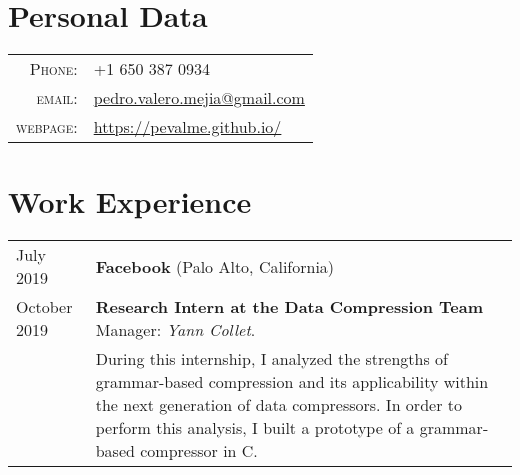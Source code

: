 \documentclass[a4paper,10pt]{article} %
\begin{document}
\pagestyle{empty} %




\par{\bigskip\par} %

\section{Personal Data}

\begin{tabular}{rl}
\textsc{Phone:} & +1 650 387 0934\\
\textsc{email:} & \href{mailto:pedro.valero.mejia@gmail.com}{pedro.valero.mejia@gmail.com} \\
\textsc{webpage:} & \href{https://pevalme.github.io/}{https://pevalme.github.io/}\\
\end{tabular}

\section{Work Experience}

\begin{tabular}{p{2.6cm}p{12.5cm}}
July 2019 & \textbf{Facebook} (Palo Alto, California) \\
October 2019 & \textcolor{azureblue}{\textbf{Research Intern at the Data Compression Team}} \hfill Manager: \emph{Yann Collet}. \\
& During this internship, I analyzed the strengths of grammar-based compression and its applicability within the next generation of data compressors.
In order to perform this analysis, I built a prototype of a grammar-based compressor in C.
\end{tabular}
\end{document}
